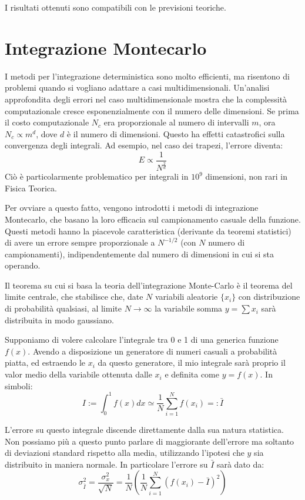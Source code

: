 \documentclass[a4paper,10pt]{article}
\begin{document}
I risultati ottenuti sono compatibili con le previsioni teoriche.

\section{Integrazione Montecarlo}

I metodi per l'integrazione deterministica sono molto efficienti, ma risentono di problemi quando si vogliano adattare a casi multidimensionali.
Un'analisi approfondita degli errori nel caso multidimensionale mostra che la complessità computazionale cresce esponenzialmente con il numero delle dimensioni. Se prima il costo computazionale $N_c$ era proporzionale al numero di intervalli $m$, ora $N_c \propto m^d$, dove $d$ è il numero di dimensioni. Questo ha effetti catastrofici sulla convergenza degli integrali. Ad esempio, nel caso dei trapezi, l'errore diventa:
$$E\propto\frac{1}{N^{\frac{2}{d}}}$$
Ciò è particolarmente problematico per integrali in $10^9$ dimensioni, non rari in Fisica Teorica.

Per ovviare a questo fatto, vengono introdotti i metodi di integrazione Montecarlo, che basano la loro efficacia sul campionamento casuale della funzione. Questi metodi hanno la piacevole caratteristica (derivante da teoremi statistici) di avere un errore sempre proporzionale a $N^{-1/2}$ (con $N$ numero di campionamenti), indipendentemente dal numero di dimensioni in cui si sta operando.

Il teorema su cui si basa la teoria dell'integrazione Monte-Carlo è il teorema del limite centrale, che stabilisce che, date $N$ variabili aleatorie $\{x_i\}$ con distribuzione di probabilità qualsiasi, al limite $N\to\infty$ la variabile somma $y = \sum x_i$ sarà distribuita in modo gaussiano.

Supponiamo di volere calcolare l'integrale tra 0 e 1 di una generica funzione $f(x)$. Avendo a disposizione un generatore di numeri casuali a probabilità piatta, ed estraendo le $x_i$ da questo generatore, il mio integrale sarà proprio il valor medio della variabile ottenuta dalle $x_i$ e definita come $y=f(x)$.
In simboli:
$$I:=\int_0^1 f(x) dx \simeq \frac{1}{N} \sum_{i=1}^{N} f(x_i) =: \bar{I}$$

L'errore su questo integrale discende direttamente dalla sua natura statistica. Non possiamo più a questo punto parlare di maggiorante dell'errore ma soltanto di deviazioni standard rispetto alla media, utilizzando l'ipotesi che $y$ sia distribuito in maniera normale. In particolare l'errore su $\bar{I}$ sarà dato da:
$$\sigma^2_{\bar{I}} = \frac{\sigma^2_x}{\sqrt{N}} = \frac{1}{N}\left(\frac{1}{N}\sum_{i=1}^N (f(x_i)-\bar{I})^2\right)$$
\end{document}
